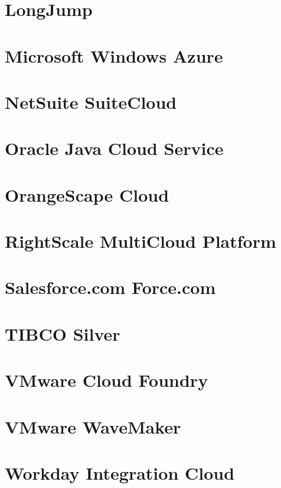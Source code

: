 \newpage
\section{LongJump}


\section{Microsoft Windows Azure}


\newpage
\section{NetSuite SuiteCloud}


\section{Oracle Java Cloud Service}


\newpage
\section{OrangeScape Cloud}


\newpage
\section{RightScale MultiCloud Platform}


\section{Salesforce.com Force.com}


\newpage
\section{TIBCO Silver}


\newpage
\section{VMware Cloud Foundry}


\newpage
\section{VMware WaveMaker}


\newpage
\section{Workday Integration Cloud}
